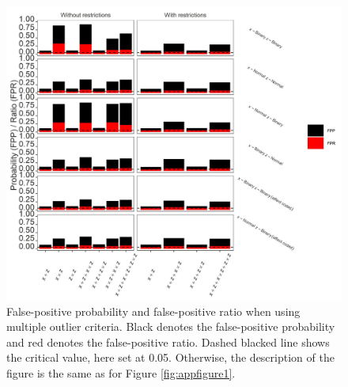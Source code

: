 \begin{figure}[ht!]
\includegraphics[width=1\textwidth]{R/Analysis/Result/Figures/Figure1BSI.jpeg}
\centering
\caption{False-positive probability and false-positive ratio when using multiple outlier criteria. Black denotes the false-positive probability and red denotes the false-positive ratio. Dashed blacked line shows the critical value, here set at 0.05. Otherwise, the description of the figure is the same as for Figure \ref{fig:appfigure1}.
}
\label{fig:appfigure4}
\end{figure}

